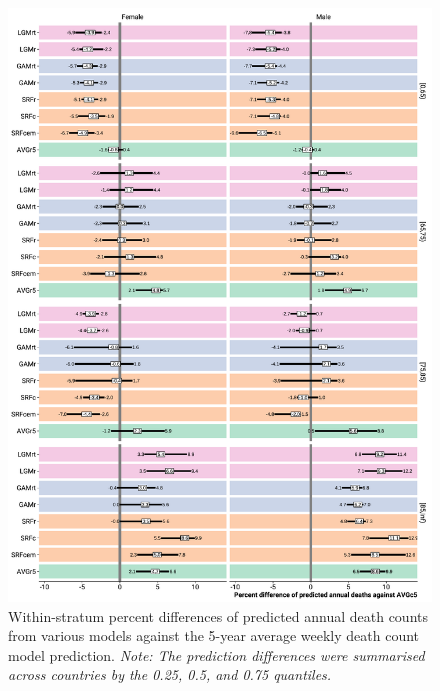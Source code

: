 \documentclass[12pt]{article}
\begin{document}
\begin{appendix}
\begin{figure}
  \caption{Within-stratum percent differences of predicted annual death counts from various models against the 5-year average weekly death count model prediction. \emph{Note: The prediction differences were summarised across countries by the 0.25, 0.5, and 0.75 quantiles.}}
  \label{fig:baselinediffstrata}
  \includegraphics{baselinediff_strata.pdf}
\end{figure}



\end{appendix}
\end{document}
